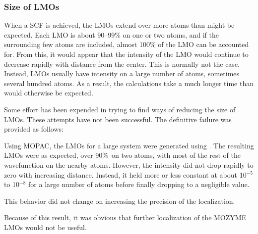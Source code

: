\subsubsection{Size of LMOs}\label{size_of_lmo}
When a SCF is achieved, the LMOs extend over more atoms than might be
expected.  Each LMO is about 90--99\% on one or two atoms, and if the
surrounding few atoms are included, almost 100\% of the LMO can be accounted
for.   From this, it would appear that the intensity of the LMO would continue
to decrease rapidly with distance from the center.  This is normally not the
case. Instead, LMOs usually have intensity on a large number of atoms,
sometimes several  hundred atoms.  As a result, the calculations take a much
longer time than would otherwise be expected.

Some effort has been expended in trying to find ways of reducing the size of
LMOs. These attempts have not been successful.  The definitive failure was
provided as follows:

Using MOPAC, the LMOs for a large system were generated using .
The resulting LMOs were as expected, over 90\%\ on two atoms, with most of the
rest of the wavefunction on the nearby atoms.  However, the intensity did not
drop rapidly to zero with increasing distance.  Instead, it held  more or less
constant at about 10$^{-5}$ to 10$^{-8}$ for a large number of atoms before
finally dropping to a negligible value.

This behavior did not change on increasing the precision of the localization.

Because of this result, it was obvious that further localization of the MOZYME 
LMOs would not be useful.
